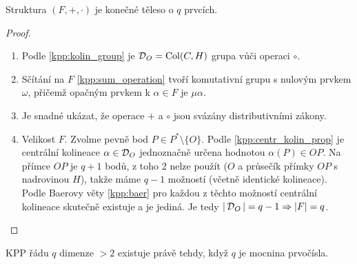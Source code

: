 \begin{theorem}[Veblenova]
    Struktura $(F,+,\cdot)$ je konečné těleso o $q$ prvcích.
\end{theorem}
\begin{proof}~
	\begin{enumerate}
		\item Podle \cref{kpp:kolin_group} je $\operatorname{\mathcal{D}}_O = \mathrm{Col}(C,H)$ grupa vůči operaci $\circ$.
		\item Sčítání na $F$ \cref{kpp:sum_operation} tvoří komutativní grupu s nulovým prvkem $\omega$, přičemž opačným prvkem k $\alpha \in F$ je $\mu \alpha$.
		\item Je snadné ukázat, že operace $+$ a $\circ$ jsou svázány distributivními zákony.
		\item Velikost $F$.
	Zvolme pevně bod $P \in P^*\setminus \{O\}$.
	Podle \cref{kpp:centr_kolin_prop} je centrální kolineace $\alpha \in \operatorname{\mathcal{D}}_O$ jednoznačně určena hodnotou $\alpha(P) \in OP$.
	Na přímce $OP$ je $q + 1$ bodů, z toho 2 nelze použít ($O$ a průsečík přímky $OP$ s nadrovinou $H$), takže máme $q - 1$ možností (včetně identické kolineace).
	Podle Baerovy věty \cref{kpp:baer} pro každou z těchto možností
centrální kolineace skutečně existuje a je jediná.
	Je tedy $|\operatorname{\mathcal{D}}_O| = q - 1 \Rightarrow |F| = q$.
	\end{enumerate}

\end{proof}
\begin{consequence}
    KPP řádu $q$ dimenze $>2$ existuje právě tehdy, když $q$ je mocnina prvočísla.
\end{consequence}

